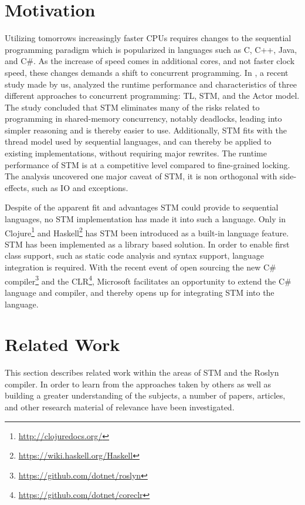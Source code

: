 \makeatletter {}\makeatother
{}
%
\section{Motivation}
Utilizing tomorrows increasingly faster \acp{CPU} requires changes to the sequential programming paradigm which is popularized in languages such as C, C++, Java, and C\#. As the increase of speed comes in additional cores, and not faster clock speed\cite{sutter2005free}, these changes demands a shift to concurrent programming. In \cite{dpt907e14trending}, a recent study made by us, analyzed the runtime performance and characteristics of three different approaches to concurrent programming: \ac{TL}, \ac{STM}, and the Actor model. The study concluded that \ac{STM} eliminates many of the risks related to programming in shared-memory concurrency, notably deadlocks, leading into simpler reasoning and is thereby easier to use. Additionally, \ac{STM} fits with the thread model used by sequential languages, and can thereby be applied to existing implementations, without requiring major rewrites. The runtime performance of \ac{STM} is at a competitive level compared to fine-grained locking\cite{dpt907e14trending}. The analysis uncovered one major caveat of \ac{STM}, it is non orthogonal with side-effects, such as \ac{IO} and exceptions\cite{dpt907e14trending}.

Despite of the apparent fit and advantages \ac{STM} could provide to sequential languages, no \ac{STM} implementation has made it into such a language. Only in Clojure\footnote{\url{http://clojuredocs.org/}} and Haskell\footnote{\url{https://wiki.haskell.org/Haskell}} has \ac{STM} been introduced as a built-in language feature. \ac{STM} has been implemented as a library based solution. In order to enable first class support, such as static code analysis and syntax support, language integration is required. With the recent event of open sourcing the new C\# compiler\footnote{\url{https://github.com/dotnet/roslyn}} and the \ac{CLR}\footnote{\url{https://github.com/dotnet/coreclr}}, Microsoft facilitates an opportunity to extend the C\# language and compiler, and thereby opens up for integrating \ac{STM} into the language.

\section{Related Work}
This section describes related work within the areas of \ac{STM} and the Roslyn compiler. In order to learn from the approaches taken by others as well as building a greater understanding of the subjects, a number of papers, articles, and other research material of relevance have been investigated. 

